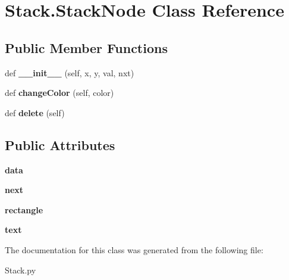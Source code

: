 \hypertarget{class_stack_1_1_stack_node}{}\section{Stack.\+Stack\+Node Class Reference}
\label{class_stack_1_1_stack_node}
\subsection*{Public Member Functions}
\begin{DoxyCompactItemize}
\item 
\mbox{\label{class_stack_1_1_stack_node_a1f7436ddc8e865ddf238656418285920}} 
def {\bfseries \+\_\+\+\_\+init\+\_\+\+\_\+} (self, x, y, val, nxt)
\item 
\mbox{\label{class_stack_1_1_stack_node_a01afb84c8c935287114b2d9bdf1d2491}} 
def {\bfseries change\+Color} (self, color)
\item 
\mbox{\label{class_stack_1_1_stack_node_a96f87a002abf757eb12e5496f4c20eb4}} 
def {\bfseries delete} (self)
\end{DoxyCompactItemize}
\subsection*{Public Attributes}
\begin{DoxyCompactItemize}
\item 
\mbox{\label{class_stack_1_1_stack_node_ae7e40c548b14d1cce9c061c7b657ae02}} 
{\bfseries data}
\item 
\mbox{\label{class_stack_1_1_stack_node_a227a52319c27da780ff37649e3caf356}} 
{\bfseries next}
\item 
\mbox{\label{class_stack_1_1_stack_node_a935a490cb8ef76ce8b2028ab77ba0bfc}} 
{\bfseries rectangle}
\item 
\mbox{\label{class_stack_1_1_stack_node_a29a49b0b74829df99922b1e5a364557a}} 
{\bfseries text}
\end{DoxyCompactItemize}


The documentation for this class was generated from the following file\+:\begin{DoxyCompactItemize}
\item 
Stack.\+py\end{DoxyCompactItemize}
